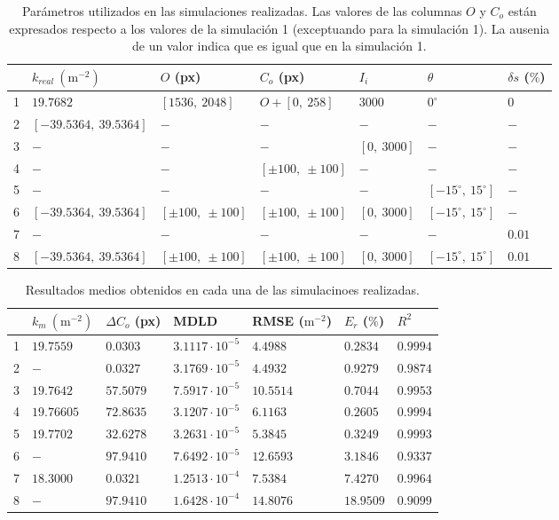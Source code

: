 \documentclass[12pt]{article}
\numberwithin{equation}{section}%
\begin{document}
\begin{table}[ht]
\centering
\caption{\small Parámetros utilizados en las simulaciones realizadas. Las valores de las columnas \(O\) y \(C_o\) están expresados respecto a los valores de la simulación 1 (exceptuando para la simulación 1). La ausenia de un valor indica que es igual que en la simulación 1.}
\label{tab:params}
\begin{tabular}{lllllll}
\hline
 &
$k_{real}\ (\text{m}^{-2})$ &
$O$ (px) &
$C_o$ (px) &
$I_i$ &
$\theta$ &
$\delta s$ ($\%$) \\
\hline
1 &
$19.7682$ &
$[1536,\ 2048]$ &
$O + [0,\ 258]$ &
$3000$ &
$0^{\circ}$ &
$0$ \\
2 &
$[-39.5364,\ 39.5364]$ &
$-$ &
$-$ &
$-$ &
$-$ &
$-$ \\
3 &
$-$ &
$-$ &
$-$ &
$[0,\ 3000]$ &
$-$ &
$-$ \\
4 &
$-$ &
$-$ &
$[\pm 100,\ \pm 100]$ &
$-$ &
$-$ &
$-$ \\
5 &
$-$ &
$-$ &
$-$ &
$-$ &
$[-15^{\circ},\ 15^{\circ}]$ &
$-$ \\
6 &
$[-39.5364,\ 39.5364]$ &
$[\pm 100,\ \pm 100]$ &
$[\pm 100,\ \pm 100]$ &
$[0,\ 3000]$ &
$[-15^{\circ},\ 15^{\circ}]$ &
$-$ \\
7 &
$-$ &
$-$       &
$-$       &
$-$       &
$-$       &
$0.01$ \\
8 &
$[-39.5364,\ 39.5364]$ &
$[\pm 100,\ \pm 100]$  &
$[\pm 100,\ \pm 100]$ &
$[0,\ 3000]$ &
$[-15^{\circ},\ 15^{\circ}]$ &
$0.01$ \\
\hline
\end{tabular}
\end{table}

\begin{table}[ht]
\centering
\caption{\small Resultados medios obtenidos en cada una de las simulacinoes realizadas.}
\label{tab:results}
\begin{tabular}{lllllll}
\hline
 &
$k_{m}\ (\text{m}^{-2})$ &
$\Delta C_o$ (px) &
MDLD &
RMSE ($\text{m}^{-2}$) &
$E_r$ ($\%$) &
$R^2$ \\
\hline
1 &
$19.7559$ &
$0.0303$ &
$3.1117\cdot10^{-5}$ &
$4.4988$ &
$0.2834$ &
$0.9994$ \\
2 &
$-$ &
$0.0327$ &
$3.1769\cdot10^{-5}$ &
$4.4932$ &
$0.9279$ &
$0.9874$ \\
3 &
$19.7642$ &
$57.5079$ &
$7.5917\cdot10^{-5}$ &
$10.5514$ &
$0.7044$ &
$0.9953$ \\
4 &
$19.76605$ &
$72.8635$ &
$3.1207\cdot10^{-5}$ &
$6.1163$ &
$0.2605$ &
$0.9994$ \\
5 &
$19.7702$ &
$32.6278$ &
$3.2631\cdot10^{-5}$ &
$5.3845$ &
$0.3249$ &
$0.9993$ \\
6 &
$-$ &
$97.9410$ &
$7.6492\cdot10^{-5}$ &
$12.6593$ &
$3.1846$ &
$0.9337$ \\
7 &
$18.3000$ &
$0.0321$       &
$1.2513\cdot10^{-4}$       &
$7.5384$       &
$7.4270$       &
$0.9964$ \\
8 &
$-$ &
$97.9410$  &
$1.6428\cdot10^{-4}$ &
$14.8076$ &
$18.9509$ &
$0.9099$ \\
\hline
\end{tabular}
\end{table}
\end{document}
